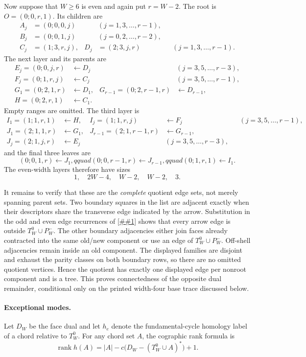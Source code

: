 \documentclass[11pt]{article}
\newcommand{\cref}[1]{\autoref{##1}}%
\newcommand{\rank}{\operatorname{rank}}
\begin{document}
Now suppose that \(W\geq6\) is even and again put \(r=W-2\).  The root is
\(O=(0;0,r,1)\).  Its children are
\begin{align*}
 A_j&=(0;0,0,j) &&(j=1,3,\ldots,r-1),\\
 B_j&=(0;0,1,j) &&(j=0,2,\ldots,r-2),\\
 C_j&=(1;3,r,j),&
 D_j&=(2;3,j,r) &&(j=1,3,\ldots,r-1).
\end{align*}
The next layer and its parents are
\begin{align*}
 E_j=(0;0,j,r)&\leftarrow D_j &&(j=3,5,\ldots,r-3),\\
 F_j=(0;1,r,j)&\leftarrow C_j &&(j=3,5,\ldots,r-1),\\
 G_1=(0;2,1,r)&\leftarrow D_1,&
 G_{r-1}=(0;2,r-1,r)&\leftarrow D_{r-1},\\
 H=(0;2,r,1)&\leftarrow C_1.&
\end{align*}
Empty ranges are omitted.  The third layer is
\begin{align*}
 I_1=(1;1,r,1)&\leftarrow H,&
 I_j=(1;1,r,j)&\leftarrow F_j &&(j=3,5,\ldots,r-1),\\
 J_1=(2;1,1,r)&\leftarrow G_1,&
 J_{r-1}=(2;1,r-1,r)&\leftarrow G_{r-1},\\
 J_j=(2;1,j,r)&\leftarrow E_j &&(j=3,5,\ldots,r-3),
\end{align*}
and the final three leaves are
\[
 (0;0,1,r)\leftarrow J_1,qquad
 (0;0,r-1,r)\leftarrow J_{r-1},qquad
 (0;1,r,1)\leftarrow I_1.
\]
The even-width layers therefore have sizes
\[
 1,\quad2W-4,\quad W-2,\quad W-2,\quad3.
\]

It remains to verify that these are the \emph{complete} quotient edge sets,
not merely spanning parent sets.  Two boundary squares in the list are
adjacent exactly when their descriptors share the transverse edge indicated
by the arrow.  Substitution in the odd and even edge recurrences of
\cref{app:encoders} shows that every arrow edge is outside
\(T_W^0\cup P_W^-\).  The other boundary adjacencies either join faces
already contracted into the same old/new component or use an edge of
\(T_W^0\cup P_W^-\).  Off-shell adjacencies remain inside an old component.
The displayed families are disjoint and exhaust the parity classes on both
boundary rows, so there are no omitted quotient vertices.  Hence the
quotient has exactly one displayed edge per nonroot component and is a tree.
This proves connectedness of the opposite dual remainder, conditional only
on the printed width-four base trace discussed below.

\paragraph{Exceptional modes.}
Let \(D_W\) be the face dual and let \(h_e\) denote the fundamental-cycle
homology label of a chord relative to \(T_W^0\).  For any chord set \(A\),
the cographic rank formula is
\begin{equation}\label{eq:tree-cotree-rank}
 \rank h(A)=|A|-c\bigl(D_W-(T_W^0\cup A)^*\bigr)+1.
\end{equation}
\end{document}
